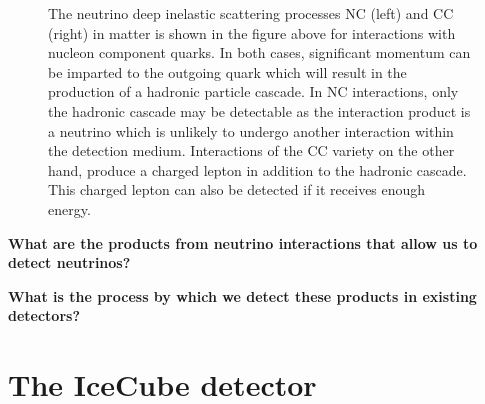 \begin{figure}
	\centering
	\caption{The neutrino deep inelastic scattering processes NC (left) and CC (right) in matter is shown in the figure above for interactions with nucleon component quarks.
	In both cases, significant momentum can be imparted to the outgoing quark which will result in the production of a hadronic particle cascade.
	In NC interactions, only the hadronic cascade may be detectable as the interaction product is a neutrino which is unlikely to undergo another interaction within the detection medium.
	Interactions of the CC variety on the other hand, produce a charged lepton in addition to the hadronic cascade.
	This charged lepton can also be detected if it receives enough energy.}
	\label{fig:DIS}
\end{figure}

\begin{figure}
\caption{}
\label{}
\end{figure}


\textbf{What are the products from neutrino interactions that allow us to detect neutrinos?}

\textbf{What is the process by which we detect these products in existing detectors?}


\section{The IceCube detector}

\begingroup
\graphicspath{{results/HESE_Final_Paper/}}

\endgroup
